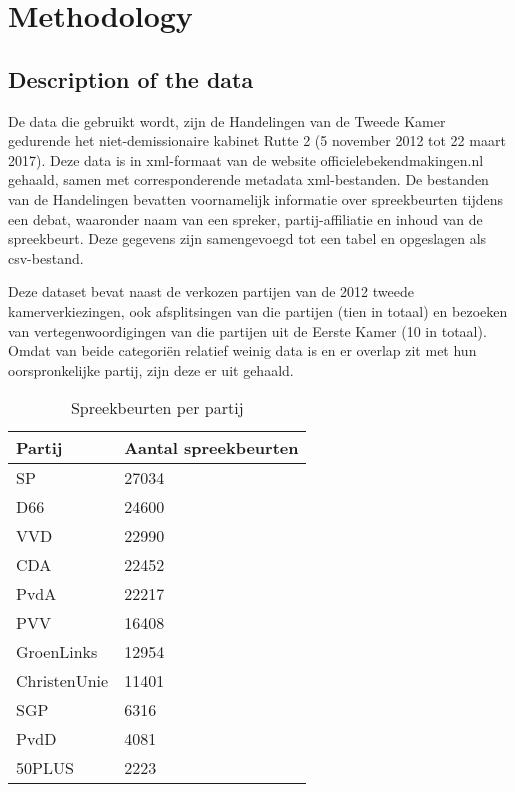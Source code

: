 \section{Methodology}
\label{sec:meth}


\subsection{Description of the data}
De data die gebruikt wordt, zijn de Handelingen van de Tweede Kamer gedurende het niet-demissionaire kabinet Rutte 2 (5 november 2012 tot 22 maart 2017). Deze data is in xml-formaat van de website officielebekendmakingen.nl gehaald, samen met corresponderende metadata xml-bestanden. De bestanden van de Handelingen bevatten voornamelijk informatie over spreekbeurten tijdens een debat, waaronder naam van een spreker, partij-affiliatie en inhoud van de spreekbeurt. Deze gegevens zijn samengevoegd tot een tabel en opgeslagen als csv-bestand.\par
Deze dataset bevat naast de verkozen partijen van de 2012 tweede kamerverkiezingen, ook afsplitsingen van die partijen (tien in totaal) en bezoeken van vertegenwoordigingen van die partijen uit de Eerste Kamer (10 in totaal). Omdat van beide categori\"{e}n relatief weinig data is en er overlap zit met hun oorspronkelijke partij, zijn deze er uit gehaald.

\begin{table}[H]
\centering
\caption{Spreekbeurten per partij}
\label{Sprpartij}
\begin{tabular}{|l|l|}
\hline
Partij       & Aantal spreekbeurten \\ \hline
SP           & 27034 \\ \hline
D66          & 24600 \\ \hline
VVD          & 22990 \\ \hline
CDA          & 22452 \\ \hline
PvdA         & 22217 \\ \hline
PVV          & 16408 \\ \hline
GroenLinks   & 12954 \\ \hline
ChristenUnie & 11401 \\ \hline
SGP          & 6316  \\ \hline
PvdD         & 4081  \\ \hline
50PLUS       & 2223  \\ \hline
\end{tabular}
\end{table}

